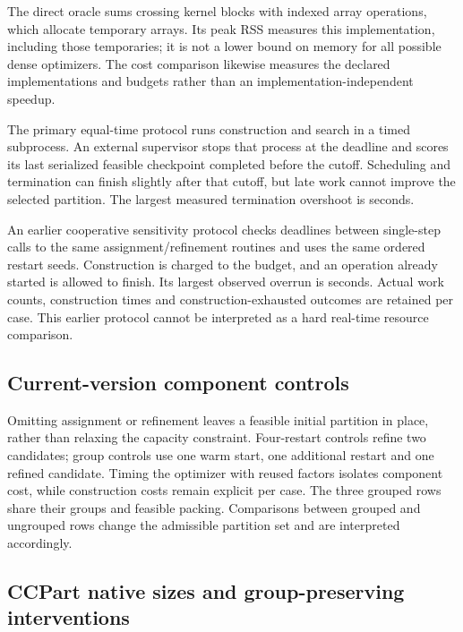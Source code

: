 The direct oracle sums crossing kernel blocks with indexed array operations,
which allocate temporary arrays. Its peak RSS measures this implementation,
including those temporaries; it is not a lower bound on memory for all possible
dense optimizers. The cost comparison likewise measures the declared
implementations and budgets rather than an implementation-independent speedup.



The primary equal-time protocol runs construction and search in a timed
subprocess. An external supervisor stops that process at the deadline and
scores its last serialized feasible checkpoint completed before the cutoff.
Scheduling and termination can finish slightly after that cutoff, but late
work cannot improve the selected partition. The largest measured termination
overshoot is \ControlsPreemptedOverrun{} seconds.



An earlier cooperative sensitivity protocol checks deadlines between single-step
calls to the same assignment/refinement routines and uses the same ordered
restart seeds. Construction is charged to the budget, and an operation already
started is allowed to finish. Its largest observed overrun is
\ControlsClockOverrun{} seconds. Actual work counts, construction times and
construction-exhausted outcomes are retained per case. This earlier protocol
cannot be interpreted as a hard real-time resource comparison.



\subsection{Current-version component controls}

Omitting assignment or refinement leaves a feasible initial partition in
place, rather than relaxing the capacity constraint. Four-restart controls
refine two candidates; group controls use one warm start, one additional
restart and one refined candidate. Timing the optimizer with reused factors
isolates component cost, while construction costs remain explicit per case.
The three grouped rows share their groups and feasible packing. Comparisons
between grouped and ungrouped rows change the admissible partition set and
are interpreted accordingly.



\subsection{CCPart native sizes and group-preserving interventions}


